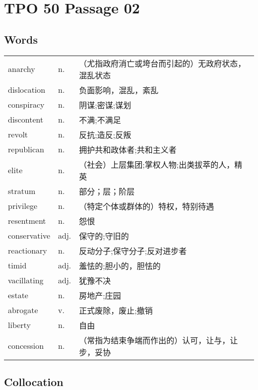 \section{TPO 50 Passage 02}

\subsection{Words}

\begin{tabular}{lll}
    anarchy      & n.   & （尤指政府消亡或垮台而引起的）无政府状态，混乱状态 \\
    dislocation  & n.   & 负面影响，混乱，紊乱                \\
    conspiracy   & n.   & 阴谋;密谋;谋划                  \\
    discontent   & n.   & 不满;不满足                    \\
    revolt       & n.   & 反抗;造反;反叛                  \\
    republican   & n.   & 拥护共和政体者;共和主义者             \\
    elite        & n.   & （社会）上层集团;掌权人物;出类拔萃的人，精英   \\
    stratum      & n.   & 部分；层；阶层                   \\
    privilege    & n.   & （特定个体或群体的）特权，特别待遇         \\
    resentment   & n.   & 怨恨                        \\
    conservative & adj. & 保守的;守旧的                   \\
    reactionary  & n.   & 反动分子;保守分子;反对进步者           \\
    timid        & adj. & 羞怯的;胆小的，胆怯的               \\
    vacillating  & adj. & 犹豫不决                      \\
    estate       & n.   & 房地产;庄园                    \\
    abrogate     & v.   & 正式废除，废止;撤销                \\
    liberty      & n.   & 自由                        \\
    concession   & n.   & （常指为结束争端而作出的）认可，让与，让步，妥协  \\
\end{tabular}

\subsection{Collocation}

